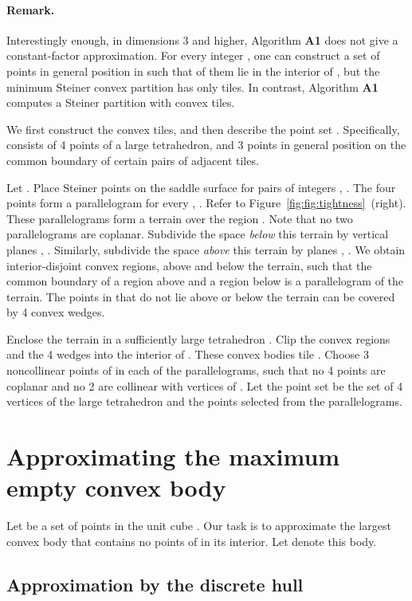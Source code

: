 \documentclass[11pt]{article}
\newcommand{\seclab}[1]{\label{sec:#1}}
\newcommand{\figref}[1]{Figure~\ref{fig:#1}}
\begin{document}
\paragraph{Remark.}
Interestingly enough, in dimensions 3 and higher, Algorithm {\bf A1}
does not give a constant-factor approximation.  For every integer ,
one can construct a set  of  points in general position in
 such that  of them lie in the interior of ,
but the minimum Steiner convex partition has only  tiles.
In contrast, Algorithm {\bf A1} computes a Steiner partition with
 convex tiles.

We first construct the convex tiles, and then describe the point set
. Specifically,  consists of 4 points of a large tetrahedron,
and 3 points in general position on the common boundary of certain
pairs of adjacent tiles.

Let . Place  Steiner points
 on the saddle surface  for pairs of
integers , .  The four points  form a parallelogram for every ,
.  Refer to
\figref{fig:tightness}~(right).  These parallelograms form a terrain over
the region .  Note that no two parallelograms are coplanar.
Subdivide the space \emph{below} this terrain by vertical planes
, .  Similarly,
subdivide the space \emph{above} this terrain by planes ,
. We obtain 
interior-disjoint convex regions,  above and  below the terrain,
such that the common boundary of a region above and a region below is
a parallelogram of the terrain.  The points in  that do not lie
above or below the terrain can be covered by 4 convex wedges.

Enclose the terrain in a sufficiently large tetrahedron . Clip the
 convex regions and the 4 wedges into the interior of . These
 convex bodies tile .  Choose 3 noncollinear points of  in
each of the  parallelograms, such that no 4 points are coplanar
and no 2 are collinear with vertices of . Let the point set  be
the set of 4 vertices of the large tetrahedron  and the 
points selected from the parallelograms.



\section{Approximating the maximum empty convex body}
\seclab{sec:body}

Let  be a set of points in the unit cube . Our task is to approximate the largest convex body  that contains no points of  in its
interior. Let  denote this body.

\subsection{Approximation by the discrete hull}
\end{document}
